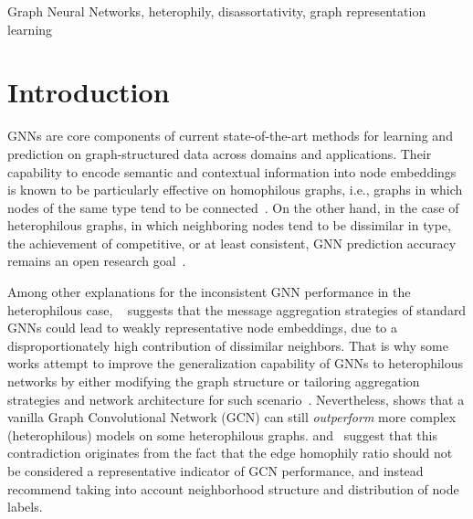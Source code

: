 \documentclass[conference]{IEEEtran}
\begin{document}
\begin{IEEEkeywords}
Graph Neural Networks, heterophily, disassortativity, graph representation learning
\end{IEEEkeywords}

\section{Introduction}\label{sec:introduction}

GNNs are core components of current state-of-the-art methods for learning and prediction on graph-structured data across domains and applications. Their capability to encode semantic and contextual information into node embeddings is known to be particularly effective on homophilous graphs, i.e., graphs in which nodes of the same type tend to be connected~\cite{kipf_semi_2017,velickovic_graph_2018}.
On the other hand, in the case of heterophilous graphs, in which neighboring nodes tend to be dissimilar in type, the achievement of competitive, or at least consistent, GNN prediction accuracy remains an open research goal~\cite{zhu_beyond_2020,jin_universal_2021}. 

Among other explanations for the inconsistent GNN performance in the heterophilous case, ~\cite{zheng_graph_2022} suggests that the message aggregation strategies of standard GNNs could lead to weakly representative node embeddings, due to a disproportionately high contribution of dissimilar neighbors.
That is why some works attempt to improve the generalization capability of GNNs to heterophilous networks by either modifying the graph structure or tailoring aggregation strategies and network architecture for such scenario~\cite{abu_mixhop_2019, zhu_beyond_2020, jin_universal_2021, wang_tree_2021,pei_geom-gcn_2019,suresh_breaking_2021,wei_node_2021,he_block_2022,yan_two_2021,bodnar_neural_2022,bo_beyond_2021,du_gbk_2022,yang_diverse_2021,chen_simple_2020,chien_adaptive_2021}.
Nevertheless, \cite{ma_is_2022} shows that a vanilla Graph Convolutional Network (GCN) can still \textit{outperform} more complex (heterophilous) models on some heterophilous graphs.
\cite{ma_is_2022} and~\cite{cavallo_2ncs_2022} suggest that this contradiction originates from the fact that the edge homophily ratio should not be considered a representative indicator of GCN performance, and instead recommend taking into account neighborhood structure and distribution of node labels.
\end{document}
